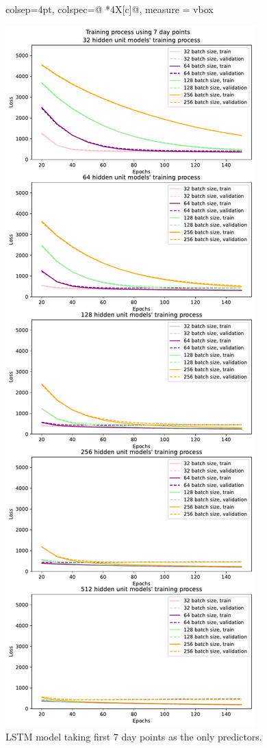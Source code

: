 \documentclass{article}
\begin{document}
\newpage
\begin{figure}[H]
    \begin{adjustwidth}{-1.5cm}{-1.5cm}
    \begin{tblr}{colsep=4pt,
             colspec={@{} *{4}{X[c]}@{}}, 
             measure = vbox}
     
            \includegraphics[width=\linewidth]{figures/hyperparameters_points_training.pdf}
            \caption{LSTM model taking first 7 day points as the only predictors.}
            \label{fig:hyper1}
        

\end{tblr}
\end{adjustwidth}
\end{figure}
\end{document}
